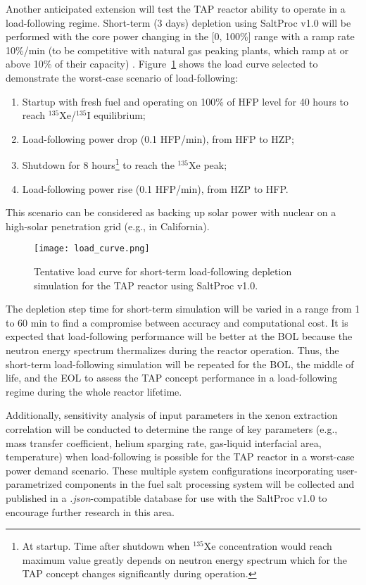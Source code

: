 Another anticipated extension will test the \gls{TAP} reactor ability to 
operate in a load-following regime. Short-term (3 days) depletion using 
SaltProc v1.0 will be performed with the core power changing in the [0, 100\%] 
range with a ramp rate 10\%/min (to be competitive with natural gas peaking 
plants, which ramp at or above 10\% of their capacity) 
\cite{huff_enabling_2018}. 
Figure~\ref{fig:load} shows the load curve selected to demonstrate the 
worst-case scenario of load-following:
\begin{enumerate}
	\item Startup with fresh fuel and operating on 100\% of \gls{HFP}
level 
	for 40 hours to reach $^{135}$Xe/$^{135}$I equilibrium;
	\item Load-following power drop (0.1 \gls{HFP}/min), from \gls{HFP} 
	to \gls{HZP};
	\item Shutdown for 8 hours\footnote{At startup. Time after shutdown when 
	$^{135}$Xe concentration would reach maximum value greatly depends on 
	neutron energy spectrum which for the \gls{TAP} concept changes 
	significantly during operation.} to reach the $^{135}$Xe peak;
	\item Load-following power rise (0.1 \gls{HFP}/min), from \gls{HZP} 
	to \gls{HFP}.
\end{enumerate}
This scenario can be considered as backing up solar power with
nuclear on a high-solar penetration grid (e.g., in California).
\begin{figure}[bth!] %
	\centering
	\texttt{[image: load\_curve.png]}
	\caption{Tentative load curve for short-term load-following depletion 
	simulation for the \gls{TAP} reactor using SaltProc v1.0.}
	\label{fig:load}
\end{figure}

The depletion step time for short-term simulation will be varied in a range 
from 1 to 60 min to find a compromise between accuracy and computational cost. 
It is expected that load-following performance will be better at the \gls{BOL} 
because the neutron energy spectrum thermalizes during the reactor operation. 
Thus, the short-term load-following simulation will be repeated for the 
\gls{BOL}, the middle of life, and the \gls{EOL} to assess the \gls{TAP} 
concept performance in a load-following regime during the whole reactor 
lifetime.

Additionally, sensitivity analysis of input parameters in the xenon extraction 
correlation will be conducted to determine the range of key parameters (e.g., 
mass transfer coefficient, helium sparging rate, gas-liquid interfacial area, 
temperature) when load-following is possible for the \gls{TAP} reactor in a 
worst-case power demand scenario. These multiple system configurations  
incorporating user-parametrized components in the fuel salt processing system 
will be collected and published in a \textit{.json}-compatible database for 
use with the SaltProc v1.0 to encourage further research in this area.

